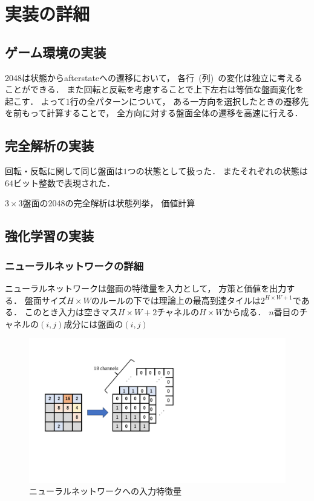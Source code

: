 \chapter{実装の詳細}

\section{ゲーム環境の実装}
2048は状態からafterstateへの遷移において， 各行~(列)~の変化は独立に考えることができる．
また回転と反転を考慮することで上下左右は等価な盤面変化を起こす．
よって$1$行の全パターンについて， ある一方向を選択したときの遷移先を前もって計算することで， 全方向に対する盤面全体の遷移を高速に行える．

\section{完全解析の実装}
回転・反転に関して同じ盤面は$1$つの状態として扱った．
またそれぞれの状態は$64$ビット整数で表現された．

$3\times3$盤面の2048の完全解析は状態列挙， 価値計算

\section{強化学習の実装}
\subsection{ニューラルネットワークの詳細}
\label{subsec:nn_impl}
ニューラルネットワークは盤面の特徴量を入力として， 方策と価値を出力する．
盤面サイズ$H \times W$のルールの下では理論上の最高到達タイルは$2^{H \times W + 1}$である．
このとき入力は空きマス$H \times W + 2$チャネルの$H \times W$から成る．
$n$番目のチャネルの$(i,j)$成分には盤面の$(i,j)$
\begin{figure}[t]
    \centering
    \includegraphics[width=0.6\linewidth{}]{figures/encoding.pdf}
    \caption{ニューラルネットワークへの入力特徴量}
    \label{fig:input_encoding}
\end{figure}

